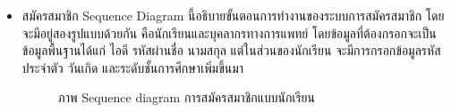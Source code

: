 \documentclass[12pt,oneside,openright,a4paper]{cpe-thai-project}
\begin{document}
\begin{itemize}
\begin{table}[!h]
\begin{tabular}{|p{4cm}|p{10cm}|}
        \end{tabular}
        \end{table}
        \newpage
        \item สมัครสมาชิก
        Sequence Diagram นี้อธิบายขั้นตอนการทำงานของระบบการสมัครสมาชิก โดยจะมีอยู่สองรูปแบบด้วยกัน คือนักเรียนและบุคลากรทางการแพทย์ 
        โดยข้อมูลที่ต้องกรอกจะเป็นข้อมูลพื้นฐานได้แก่ ไอดี รหัสผ่านชื่อ นามสกุล แต่ในส่วนของนักเรียน จะมีการกรอกข้อมูลรหัสประจำตัว วันเกิด และระดับชั้นการศึกษาเพิ่มขึ้นมา
        \newpage
        \begin{figure}[!ht]\centering
          \setlength{\fboxrule}{0.2mm} %
          \setlength{\fboxsep}{1cm}
          \caption{ภาพ Sequence diagram การสมัครสมาชิกแบบนักเรียน}\label{fig:activity6}

\end{figure}
\end{itemize}
\end{document}
